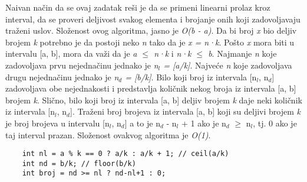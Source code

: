 \documentclass{article}
\begin{document}
\newline Naivan način da se ovaj zadatak reši je da se primeni linearni prolaz kroz interval,
da se proveri deljivost svakog elementa i brojanje onih koji zadovoljavaju traženi
uslov. Složenost ovog algoritma, jasno je \textit{O(b - a)}.
\newline Da bi broj \textit{x} bio deljiv brojem \textit{k} potrebno je da postoji neko \textit{n} tako da je \newline\textit{x = n·k}. Pošto \textit{x} mora biti u intervalu [a, b], mora da važi da je \textit{a $\leq$ n·k} i \textit{n·k $\leq$ b}. Najmanje \textit{n} koje zadovoljava prvu nejednačinu jednako je \textit{n$_l$ = [a/k]}. Najveće
\textit{n} koje zadovoljava drugu nejednačinu jednako je \textit{n$_d$ = [b/k]}. Bilo koji broj iz
intervala [n$_l$, n$_d$] zadovoljava obe nejednakosti i predstavlja količnik nekog broja
iz intervala [a, b] brojem \textit{k}. Slično, bilo koji broj iz intervala [a, b] deljiv brojem \textit{k} daje neki količnik iz intervala [n$_l$, n$_d$]. Traženi broj brojeva iz intervala
[a, b] koji su deljivi brojem \textit{k} je broj brojeva u intervalu [n$_l$, n$_d$] a to je
n$_d$ - n$_l$ + 1 ako je n$_d$ $\geq$ n$_l$, tj. 0 ako je taj interval prazan. Složenost ovakvog algoritma je \textit{O(1)}.
\newline
\begin{lstlisting}
    int nl = a % k == 0 ? a/k : a/k + 1; // ceil(a/k)
    int nd = b/k; // floor(b/k)
    int broj = nd >= nl ? nd-nl+1 : 0;
\end{lstlisting}
\end{document}
